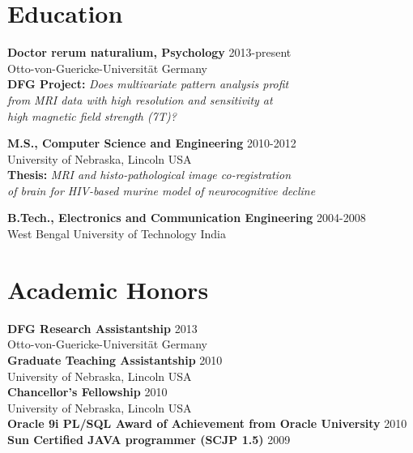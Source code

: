 \documentclass[line, margin]{res}
\begin{document}
\begin{resume}
\section{Education}

\textbf{Doctor rerum naturalium, Psychology} \hfill 2013-present\\ 
Otto-von-Guericke-Universit\"{a}t \hfill Germany\\
\small\textbf{DFG Project:} \textit{Does multivariate pattern analysis profit\\ 
from MRI data with high resolution and sensitivity at\\high magnetic field strength (7T)?}

\textbf{M.S., Computer Science and Engineering} \hfill 2010-2012\\
University of Nebraska, Lincoln \hfill USA\\
\small\textbf{Thesis:} \textit{MRI and histo-pathological image co-registration\\ 
of brain for HIV-based murine model of neurocognitive decline}

\textbf{B.Tech., Electronics and Communication Engineering} \hfill 2004-2008\\
West Bengal University of Technology \hfill India\\



\section{Academic Honors}
\textbf{DFG Research Assistantship} \hfill 2013\\
Otto-von-Guericke-Universit\"{a}t \hfill Germany\\

\textbf{Graduate Teaching Assistantship} \hfill 2010\\
University of Nebraska, Lincoln \hfill USA\\

\textbf{Chancellor's Fellowship} \hfill 2010\\
University of Nebraska, Lincoln \hfill USA\\

\textbf{Oracle 9i PL/SQL Award of Achievement from Oracle University} \hfill 2010\\

\textbf{Sun Certified JAVA programmer (SCJP 1.5)} \hfill 2009\\


\end{resume}
\end{document}
